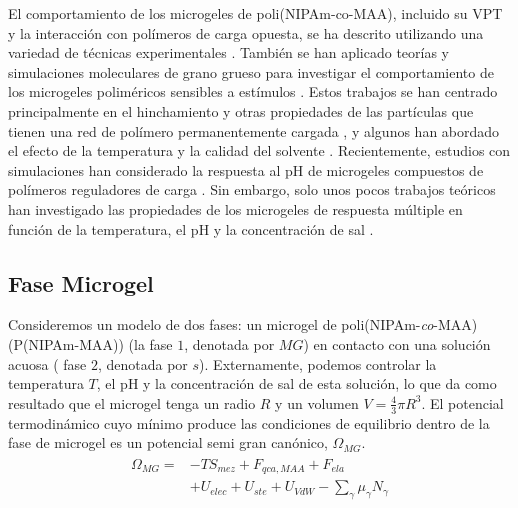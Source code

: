 El comportamiento de los microgeles de poli(NIPAm-co-MAA), incluido su VPT y la interacci\'on con pol\'imeros de carga opuesta, se ha descrito utilizando una variedad de t\'ecnicas experimentales \cite{Hoare2004,Dowding2000,Kleinen2008,Kleinen2010, Giussi2015, Su2016,Giussi2020}.
Tambi\'en se han aplicado teor\'ias  y simulaciones moleculares de grano grueso para investigar el comportamiento de los microgeles polim\'ericos sensibles a est\'imulos \cite{quesada2011gel,ahualli2016coarse,Landsgesell2019SM}.
Estos trabajos se han centrado principalmente en el hinchamiento y otras propiedades de las part\'iculas que tienen una red de pol\'imero permanentemente cargada , y algunos han abordado el efecto de la temperatura y la calidad del solvente \cite{Jha2011, QuesadaPerez2013, moncho-jorda2016a, ahualli2016coarse, AdroherBenitez2017PCCP}.
Recientemente, estudios  con simulaciones han considerado la respuesta al pH de microgeles compuestos de pol\'imeros reguladores de carga \cite{Schroeder2015,Rud2017,Sean2018, Hofzumahaus2018,Lu2019}.
Sin embargo, solo unos pocos trabajos te\'oricos han investigado las propiedades de los microgeles de respuesta m\'ultiple en funci\'on de la temperatura, el pH y la concentración de sal  \cite{CaprilesGonzalez2008,polotsky2013collapse}.


\subsection{Fase Microgel}\label{sec:theory}


Consideremos un modelo de dos fases: un microgel de poli(NIPAm-\emph{co}-MAA) (P(NIPAm-MAA)) (la fase $1$, denotada por $MG$) en contacto con una soluci\'on acuosa ( fase $2$, denotada por $s$).
Externamente, podemos controlar la temperatura $T$, el pH y la concentraci\'on de sal de esta soluci\'on, lo que da como resultado que el microgel tenga un radio $R$ y un volumen $V=\frac{4}{3}\pi R^3$.
El potencial termodin\'amico cuyo m\'inimo produce las condiciones de equilibrio dentro de la fase de microgel es un  potencial semi gran can\'onico, $\Omega_{MG}$.
%
\begin{align}
    \begin{aligned}
       \Omega_{MG}=& -TS_{mez} + F_{qca,MAA} +  F_{ela}\\
       & + U_{elec}+  U_{ste} + U_{VdW} -{\sum_{\gamma}
        {\mu_\gamma N_\gamma}}
    \end{aligned}
    \label{eq:gel:free-energy-implicit}
\end{align}
%

